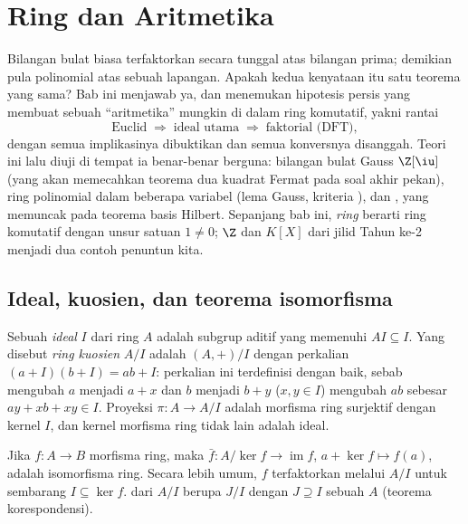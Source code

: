 \chapter{Ring dan Aritmetika}\label{ch:b3:rings}

Bilangan bulat biasa terfaktorkan secara tunggal atas bilangan prima; demikian pula
polinomial atas sebuah lapangan. Apakah kedua kenyataan itu satu teorema yang sama? Bab ini
menjawab ya, dan menemukan hipotesis persis yang membuat sebuah ``aritmetika''
mungkin di dalam ring komutatif, yakni rantai
\[
\text{Euclid} \;\Longrightarrow\; \text{ideal utama}
\;\Longrightarrow\; \text{faktorial (DFT)},
\]
dengan semua implikasinya dibuktikan dan semua konversnya disanggah. Teori ini
lalu diuji di tempat ia benar-benar berguna: bilangan bulat Gauss
$\Z[\iu]$ (yang akan memecahkan teorema dua kuadrat Fermat pada
soal akhir pekan), ring polinomial dalam beberapa variabel (lema
Gauss, kriteria ), dan , yang memuncak
pada teorema basis Hilbert. Sepanjang bab ini, \emph{ring} berarti
ring komutatif dengan unsur satuan $1 \neq 0$;  $\Z$ dan $K[X]$
dari jilid Tahun ke-2 menjadi dua contoh penuntun kita.

\section{Ideal, kuosien, dan teorema isomorfisma}

\begin{definition}\label{def:b3:rings:ideal}
Sebuah \emph{ideal} $I$ dari ring $A$ adalah subgrup
aditif yang memenuhi $AI \subseteq I$. Yang disebut \emph{ring
kuosien} $A/I$ adalah  $(A, +)/I$
dengan perkalian $(a + I)(b + I) = ab + I$: perkalian ini terdefinisi dengan baik,
sebab mengubah $a$ menjadi $a + x$ dan $b$ menjadi $b + y$ ($x, y \in I$)
mengubah $ab$ sebesar $ay + xb + xy \in I$. Proyeksi $\pi \colon A
\to A/I$ adalah morfisma ring surjektif dengan kernel $I$, dan kernel
morfisma ring tidak lain adalah ideal.
\end{definition}

\begin{theorem}\label{thm:b3:rings:firstiso}
Jika $f \colon A \to B$ morfisma ring, maka $\bar f\colon
A/\ker f \to \operatorname{im} f$, $a + \ker f \mapsto f(a)$, adalah
isomorfisma ring. Secara lebih umum, $f$ terfaktorkan melalui $A/I$ untuk sembarang
 $I \subseteq \ker f$.  dari $A/I$ berupa $J/I$ dengan
$J \supseteq I$ sebuah  $A$ (teorema korespondensi).
\end{theorem}

